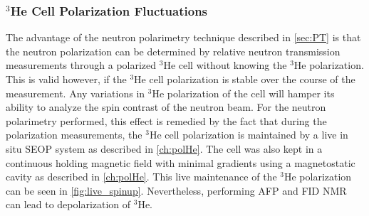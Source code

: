 

\subsubsection{$^3$He Cell Polarization Fluctuations}


The advantage of the neutron polarimetry technique described in \cref{sec:PT} is that the neutron polarization can be determined by relative neutron transmission measurements through a polarized $^3$He cell without knowing the $^3$He polarization. This is valid however, if the $^3$He cell polarization is stable over the course of the measurement. Any variations in $^3$He polarization of the cell will hamper its ability to analyze the spin contrast of the neutron beam. For the neutron polarimetry performed, this effect is remedied by the fact that during the polarization measurements, the $^3$He cell polarization is maintained by a live in situ SEOP system as described in \cref{ch:polHe}. The cell was also kept in a continuous holding magnetic field with minimal gradients using a magnetostatic cavity as described in \cref{ch:polHe}. This live maintenance of the $^3$He polarization can be seen in \cref{fig:live_spinup}. Nevertheless, performing AFP and FID NMR can lead to depolarization of $^3$He.  

